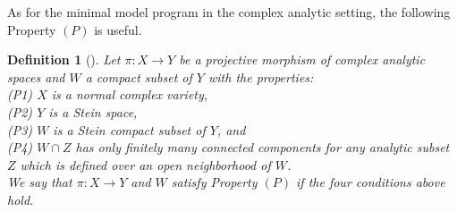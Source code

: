 \documentclass[12pt]{amsart}
\numberwithin{equation}{section}
\theoremstyle{definition}
\theoremstyle{plain}
\newtheorem{definition}  [theorem]     {Definition}
\newtheorem*{thm A*}{Theorem A}
\newtheorem*{thm B*}{Theorem B}
\newtheorem*{thm C*}{Theorem C}
\newtheorem*{thm D*}{Theorem D}
\theoremstyle{definition}
\renewcommand{\1}{\mathds{1}}
\renewcommand{\>}{\rightarrow}
\begin{document}
As for the minimal model program in the complex analytic setting, the following Property $(P)$ is useful.
\begin{definition}[{\cite{FujinoBCHM}}]
Let $\pi: X \rightarrow Y$ be a projective morphism of complex analytic spaces and $W$ a compact subset of $Y$ with the properties:\\
\emph{(P1)} $X$ is a normal complex variety,\\
\emph{(P2)} $Y$ is a Stein space,\\
\emph{(P3)} $W$ is a Stein compact subset of $Y$, and\\
\emph{(P4)} $W \cap Z$ has only finitely many connected components for any analytic subset $Z$ which is defined over an open neighborhood of $W$.\\
We say that $\pi : X \to Y$ and $W$ satisfy \emph{Property $(P)$} if the four conditions above hold.
\end{definition}
\end{document}
